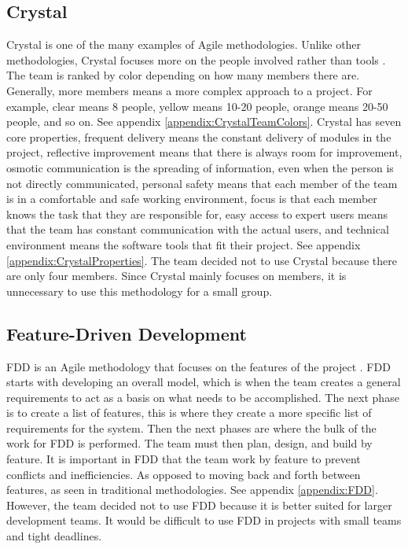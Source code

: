 \subsection{Crystal}
Crystal is one of the many examples of Agile methodologies. Unlike other methodologies, Crystal focuses more on the people involved rather than tools \cite{ref:Crystal}. The team is ranked by color depending on how many members there are. Generally, more members means a more complex approach to a project. For example, clear means 8 people, yellow means 10-20 people, orange means 20-50 people, and so on. See appendix \ref{appendix:CrystalTeamColors}. Crystal has seven core properties, frequent delivery means the constant delivery of modules in the project, reflective improvement means that there is always room for improvement, osmotic communication is the spreading of information, even when the person is not directly communicated, personal safety means that each member of the team is in a comfortable and safe working environment, focus is that each member knows the task that they are responsible for, easy access to expert users means that the team has constant communication with the actual users, and technical environment means the software tools that fit their project. See appendix \ref{appendix:CrystalProperties}. The team decided not to use Crystal because there are only four members. Since Crystal mainly focuses on members, it is unnecessary to use this methodology for a small group.

\subsection{Feature-Driven Development}
FDD is an Agile methodology that focuses on the features of the project \cite{ref:FDD}. FDD starts with developing an overall model, which is when the team creates a general requirements to act as a basis on what needs to be accomplished. The next phase is to create a list of features, this is where they create a more specific list of requirements for the system. Then the next phases are where the bulk of the work for FDD is performed. The team must then plan, design, and build by feature. It is important in FDD that the team work by feature to prevent conflicts and inefficiencies. As opposed to moving back and forth between features, as seen in traditional methodologies. See appendix \ref{appendix:FDD}. However, the team decided not to use FDD because it is better suited for larger development teams. It would be difficult to use FDD in projects with small teams and tight deadlines. \cite{ref:FDDDisadvantage}

